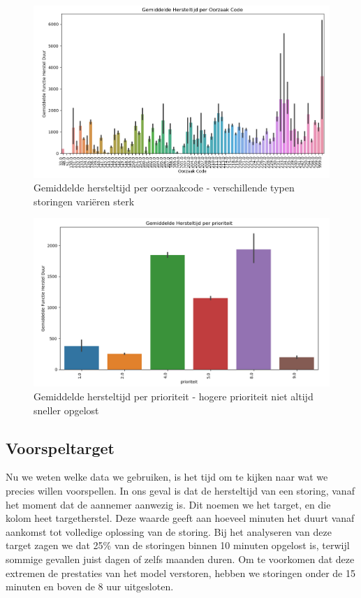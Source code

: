 \documentclass{article}
\begin{document}
\begin{figure}[H]
    \centering
    \includegraphics[width=12cm]{oorzakcode.png}
    \caption{Gemiddelde hersteltijd per oorzaakcode - verschillende typen storingen variëren sterk}
\end{figure}

\begin{figure}[H]
    \centering
    \includegraphics[width=12cm]{priorteit.png}
    \caption{Gemiddelde hersteltijd per prioriteit - hogere prioriteit niet altijd sneller opgelost}
\end{figure}

\subsection{Voorspeltarget}
Nu we weten welke data we gebruiken, is het tijd om te kijken naar wat we precies willen voorspellen. In ons geval is dat de hersteltijd van een storing, vanaf het moment dat de aannemer aanwezig is. Dit noemen we het target, en die kolom heet targetherstel. Deze waarde geeft aan hoeveel minuten het duurt vanaf aankomst tot volledige oplossing van de storing. Bij het analyseren van deze target zagen we dat 25\% van de storingen binnen 10 minuten opgelost is, terwijl sommige gevallen juist dagen of zelfs maanden duren. Om te voorkomen dat deze extremen de prestaties van het model verstoren, hebben we storingen onder de 15 minuten en boven de 8 uur uitgesloten.
\end{document}
